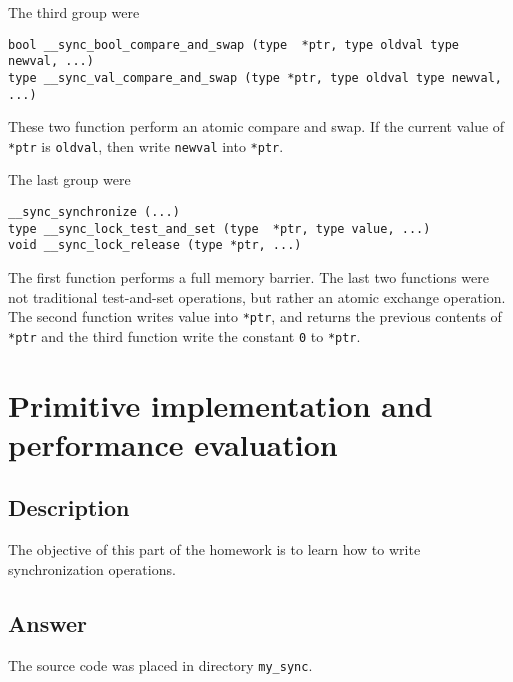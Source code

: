 \documentclass[12pt]{article}
\begin{document}
The third group were
\begin{verbatim}
bool __sync_bool_compare_and_swap (type  *ptr, type oldval type newval, ...)
type __sync_val_compare_and_swap (type *ptr, type oldval type newval, ...)
\end{verbatim}
These two function perform an atomic compare and swap. If the current value of 
\texttt{*ptr} is \texttt{oldval}, then write \texttt{newval} into \texttt{*ptr}.

The last group were
\begin{verbatim}
__sync_synchronize (...)
type __sync_lock_test_and_set (type  *ptr, type value, ...)
void __sync_lock_release (type *ptr, ...)
\end{verbatim}
The first function performs a full memory barrier. The last two functions were 
not traditional test-and-set operations, but rather an atomic exchange operation. 
The second function writes value into \texttt{*ptr}, and returns the previous 
contents of \texttt{*ptr} and the third function write the constant \texttt{0} to 
\texttt{*ptr}.

\section{Primitive implementation and performance evaluation}
\subsection{Description}
The objective of this part of the homework is to learn how to write 
synchronization operations.

\subsection{Answer}
The source code was placed in directory \texttt{my\_sync}.
\end{document}
